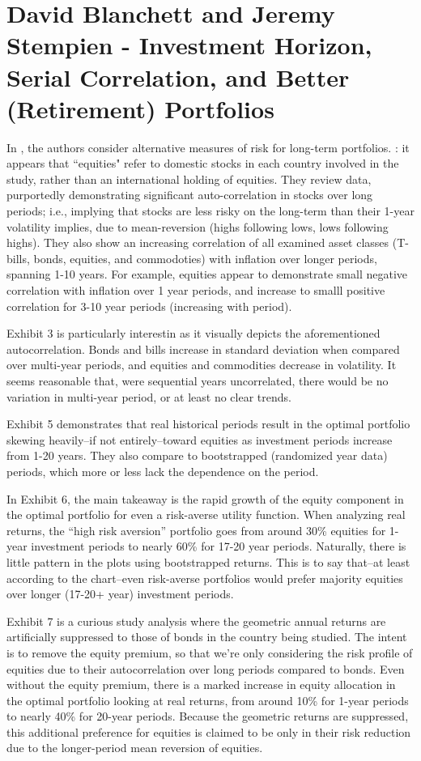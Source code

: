 \documentclass{article}
\begin{document}
\section{David Blanchett and Jeremy Stempien  - Investment Horizon, Serial Correlation, and Better (Retirement) Portfolios}
In \cite{Blanchett2024}, the authors consider alternative measures of risk for long-term portfolios.  \note{[Note]}: it appears that ``equities" refer to domestic stocks in each country involved in the study, rather than an international holding of equities.  They review data, purportedly demonstrating significant auto-correlation in stocks over long periods; i.e., implying that stocks are less risky on the long-term than their 1-year volatility implies, due to mean-reversion (highs following lows, lows following highs).  They also show an increasing correlation of all examined asset classes (T-bills, bonds, equities, and commodoties) with inflation over longer periods, spanning 1-10 years.  For example, equities appear to demonstrate small negative correlation with inflation over 1 year periods, and increase to smalll positive correlation for 3-10 year periods (increasing with period).

Exhibit 3 is particularly interestin as it visually depicts the aforementioned autocorrelation.  Bonds and bills increase in standard deviation when compared over multi-year periods, and equities and commodities decrease in volatility.  It seems reasonable that, were sequential years uncorrelated, there would be no variation in multi-year period, or at least no clear trends.

Exhibit 5 demonstrates that real historical periods result in the optimal portfolio skewing heavily--if not entirely--toward equities as investment periods increase from 1-20 years.  They also compare to bootstrapped (randomized year data) periods, which more or less lack the dependence on the period.

In Exhibit 6, the main takeaway is the rapid growth of the equity component in the optimal portfolio for even a risk-averse utility function.  When analyzing real returns, the ``high risk aversion'' portfolio goes from around 30\% equities for 1-year investment periods to nearly 60\% for 17-20 year periods.  Naturally, there is little pattern in the plots using bootstrapped returns.  This is to say that--at least according to the chart--even risk-averse portfolios would prefer majority equities over longer (17-20+ year) investment periods.

Exhibit 7 is a curious study analysis where the geometric annual returns are artificially suppressed to those of bonds in the country being studied.  The intent is to remove the equity premium, so that we're only considering the risk profile of equities due to their autocorrelation over long periods compared to bonds.  Even without the equity premium, there is a marked increase in equity allocation in the optimal portfolio looking at real returns, from around 10\% for 1-year periods to nearly 40\% for 20-year periods.  Because the geometric returns are suppressed, this additional preference for equities is claimed to be only in their risk reduction due to the longer-period mean reversion of equities.  
\end{document}
